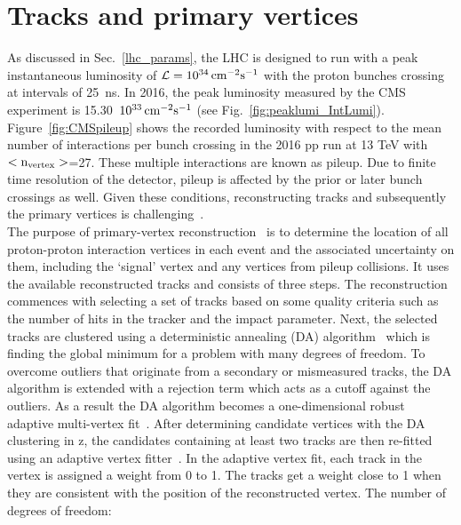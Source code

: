 \section{Tracks and primary vertices}
As discussed in Sec.~\ref{lhc_params}, the LHC is designed to run with a peak instantaneous luminosity of $\mathcal{L}=10^{34}\,{\rm cm^{-2}s^{-1}}$ with the proton bunches crossing at intervals of 25~ns. 
In 2016, the peak luminosity measured by the CMS experiment is 15.30~$10^{33}\,{\rm cm^{-2}s^{-1}}$ (see Fig.~\ref{fig:peaklumi_IntLumi}). Figure~\ref{fig:CMSpileup} shows the recorded luminosity with respect to the mean number of interactions per bunch crossing in the 2016 pp run at 13 TeV with $\rm <n_{vertex}>$=27. These multiple interactions are known as pileup. Due to finite time resolution of the detector, pileup is affected by the prior or later bunch crossings as well. Given these conditions, reconstructing tracks and subsequently the primary vertices is challenging~\cite{PV_1}.\\ 
The purpose of primary-vertex reconstruction~\cite{PV_2} is to determine the location of all proton-proton interaction vertices in each event and the associated uncertainty on them, including the ‘signal’ vertex and any vertices from pileup collisions. It uses the available reconstructed tracks and consists of three steps.
The reconstruction commences with selecting a set of tracks based on some quality criteria such as the number of hits in the tracker and the impact parameter. Next, the selected tracks are clustered using a deterministic annealing (DA) algorithm~\cite{PV_3} which is finding the global minimum for a problem with many degrees of freedom. To overcome outliers that  originate from a secondary or mismeasured tracks, the DA algorithm is extended with a rejection term which acts as a cutoff against the outliers. As a result the DA algorithm becomes a one-dimensional robust adaptive multi-vertex fit~\cite{mvf}. After determining candidate vertices with the DA clustering in z, the candidates containing at least two tracks are then re-fitted using an adaptive vertex fitter~\cite{VertFit}. In the adaptive vertex fit, each track in the vertex is assigned a weight from 0 to 1. The tracks get a weight close to 1 when they are consistent with the position of the reconstructed vertex. The number of degrees of freedom:
